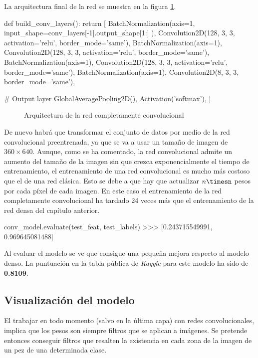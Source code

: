La arquitectura final de la red se muestra en la figura \ref{fcn_arch}.

\begin{python}
def build_conv_layers():
    return [
        BatchNormalization(axis=1,
            input_shape=conv_layers[-1].output_shape[1:]
        ),
        Convolution2D(128, 3, 3, activation='relu', border_mode='same'),
        BatchNormalization(axis=1),
        Convolution2D(128, 3, 3, activation='relu', border_mode='same'),
        BatchNormalization(axis=1),
        Convolution2D(128, 3, 3, activation='relu', border_mode='same'),
        BatchNormalization(axis=1),
        Convolution2D(8, 3, 3, border_mode='same'),

        # Output layer
        GlobalAveragePooling2D(),
        Activation('softmax'),
    ]
\end{python}


\begin{figure}
    \caption{Arquitectura de la red completamente convolucional}
\label{fcn_arch}
\end{figure}

De nuevo habrá que transformar el conjunto de datos por medio de la red
convolucional preentrenada, ya que se va a usar un tamaño de imagen de
$360\times640$. Aunque, como se ha comentado, la red convolucional admite un
aumento del tamaño de la imagen sin que crezca exponencialmente el tiempo de
entrenamiento, el entrenamiento de una red convolucional es mucho más costoso
que el de una red clásica. Esto se debe a que hay que actualizar $n\timesn$
pesos por cada píxel de cada imagen. En este caso el entrenamiento de la red
completamente convolucional ha tardado 24 veces más que el entrenamiento de la
red densa del capítulo anterior.

\begin{python}
conv_model.evaluate(test_feat, test_labels)
>>> [0.243715549991, 0.969645081488]
\end{python}

Al evaluar el modelo se ve que consigue una pequeña mejora respecto al modelo
denso. La puntuación en la tabla pública de \textit{Kaggle} para este modelo ha
sido de \textbf{0.8109}.


\subsection{Visualización del modelo}

El trabajar en todo momento (salvo en la última capa) con redes
convolucionales, implica que los pesos son siempre filtros que se aplican a
imágenes. Se pretende entonces conseguir filtros que resalten la existencia en
cada zona de la imagen de un pez de una determinada clase.


